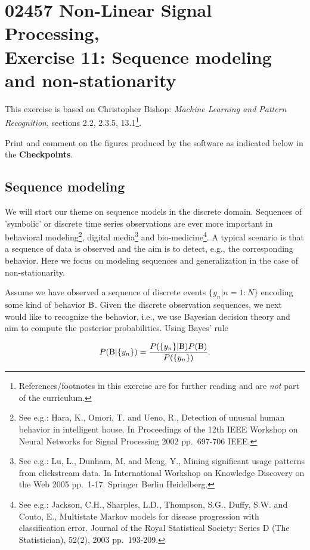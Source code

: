 \documentclass[A4,12pt]{article}    %
\begin{document}
\section*{02457 Non-Linear Signal Processing,\\
 Exercise 11: Sequence modeling and non-stationarity}

This exercise is based on Christopher Bishop: {\it Machine
Learning and Pattern Recognition}, sections 2.2, 2.3.5, 13.1\footnote{References/footnotes in this exercise are for further reading and are \emph{not} part of the curriculum.}.

Print and comment on the figures produced by the software as indicated below in the {\bf Checkpoints}.

\subsection*{Sequence modeling}
We will start our theme on sequence models in the discrete domain. Sequences of 'symbolic' or discrete time series observations are ever more important in
behavioral modeling\footnote{See e.g.: Hara, K., Omori, T. and Ueno, R., Detection of unusual human behavior in intelligent house. In  Proceedings of the 12th IEEE Workshop on Neural Networks for Signal Processing 2002 pp.\ 697-706 IEEE.},
digital media\footnote{See e.g.: Lu, L., Dunham, M. and Meng, Y.,  Mining significant usage patterns from clickstream data. In International Workshop on Knowledge Discovery on the Web 2005 pp.\ 1-17. Springer Berlin Heidelberg.}
and bio-medicine\footnote{See e.g.: Jackson, C.H., Sharples, L.D., Thompson, S.G., Duffy, S.W. and Couto, E.,  Multistate Markov models for disease progression with classification error. Journal of the Royal Statistical Society: Series D (The Statistician), 52(2), 2003 pp.\ 193-209. }. A typical scenario is that a sequence of data is observed and the aim is to detect, e.g., the corresponding behavior. Here we focus on modeling sequences and generalization in the case of non-stationarity.

Assume we have observed a sequence of discrete events $\{y_n | n = 1:N\}$ encoding some kind of behavior ${\rm B}$. Given the discrete observation sequences, we next would like to recognize the behavior, i.e., we use Bayesian decision theory and aim to compute the posterior probabilities. Using Bayes' rule


\begin{eqnarray}
P( {\rm B}| \{y_n\}) = \frac{P(\{y_n\}| {\rm B})P({\rm
B})}{P(\{y_n\})}.
\end{eqnarray}
\end{document}
